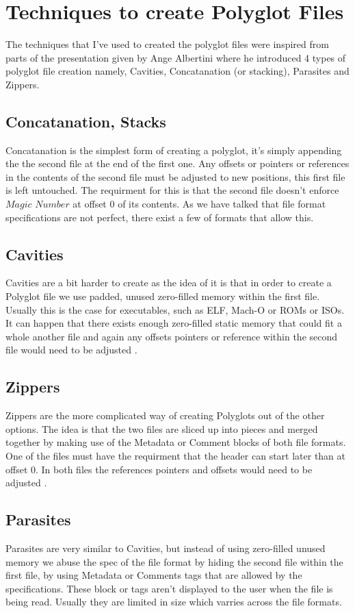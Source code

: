 \section{Techniques to create Polyglot Files}
The techniques that I've used to created the polyglot files were inspired from parts of the presentation
given by Ange Albertini where he introduced 4 types of polyglot file creation namely, Cavities, Concatanation (or stacking), Parasites and
Zippers\cite{Ange-Albertini}.

\subsection{Concatanation, Stacks}
Concatanation is the simplest form of creating a polyglot, it's simply appending the the second file at the end of the first one.
Any offsets or pointers or references in the contents of the second file must be adjusted to new positions, this first file is left untouched.
The requirment for this is that the second file doesn't enforce $Magic$ $Number$ at offset 0 of its contents. As we have talked that file format specifications
are not perfect, there exist a few of formats that allow this.

\subsection{Cavities}
Cavities are a bit harder to create as the idea of it is that in order to create a Polyglot file we use padded, unused zero-filled memory
within the first file. Usually this is the case for executables, such as ELF, Mach-O or ROMs or ISOs. It can happen that there exists enough
zero-filled static memory that could fit a whole another file and again any offsets pointers or reference within the second file would need to be
adjusted \cite{Ange2}.

\subsection{Zippers}
Zippers are the more complicated way of creating Polyglots out of the other options. The idea is that the two files are sliced up into
pieces and merged together by making use of the Metadata or Comment blocks of both file formats. One of the files must have the requirment
that the header can start later than at offset 0. In both files the references pointers and offsets would need to be adjusted \cite{Ange2}.

\subsection{Parasites}
Parasites are very similar to Cavities, but instead of using zero-filled unused memory we abuse the spec of the file format by hiding
the second file within the first file, by using Metadata or Comments tags that are allowed by the specifications. These block or tags aren't displayed
to the user when the file is being read. Usually they are limited in size which varries across the file formats.
